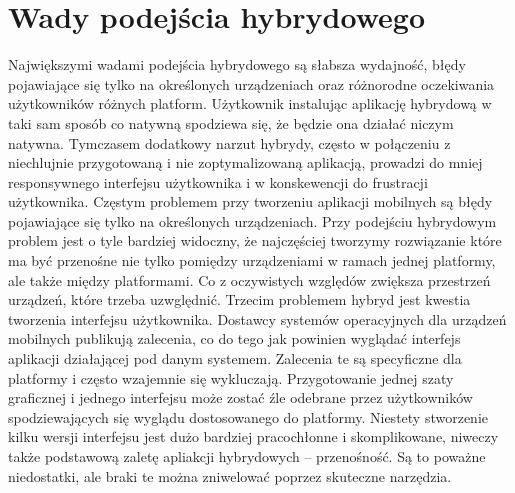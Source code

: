 \documentclass[brudnopis]{xmgr}
\begin{document}
\section{Wady podejścia hybrydowego}
Największymi wadami podejścia hybrydowego są słabsza wydajność, błędy
pojawiające się tylko na określonych urządzeniach oraz różnorodne oczekiwania
użytkowników różnych platform. Użytkownik instalując aplikację hybrydową w taki sam sposób co 
natywną spodziewa się, że będzie ona działać niczym natywna. Tymczasem
dodatkowy narzut hybrydy, często w połączeniu z niechlujnie przygotowaną i nie
zoptymalizowaną aplikacją, prowadzi do mniej responsywnego interfejsu
użytkownika i w konskewencji do frustracji użytkownika. Częstym problemem przy
tworzeniu aplikacji mobilnych są błędy pojawiające się tylko na określonych
urządzeniach. Przy podejściu hybrydowym problem jest o tyle bardziej widoczny, że
najczęściej tworzymy rozwiązanie które ma być przenośne nie tylko pomiędzy urządzeniami w ramach jednej platformy, ale także między platformami. Co z oczywistych względów zwiększa przestrzeń urządzeń, które trzeba uzwględnić. Trzecim problemem hybryd jest kwestia
tworzenia interfejsu użytkownika. Dostawcy systemów operacyjnych dla urządzeń
mobilnych publikują zalecenia, co do tego jak powinien wyglądać interfejs aplikacji
działającej pod danym systemem. Zalecenia te są specyficzne dla platformy i często
wzajemnie się wykluczają. Przygotowanie jednej szaty graficznej i jednego interfejsu
może zostać źle odebrane przez użytkowników spodziewających się wyglądu
dostosowanego do platformy. Niestety stworzenie kilku wersji interfejsu jest dużo
bardziej pracochłonne i skomplikowane, niweczy także podstawową zaletę apliakcji
hybrydowych – przenośność. 
Są to poważne niedostatki, ale braki te można zniwelować poprzez skuteczne narzędzia.
\end{document}
